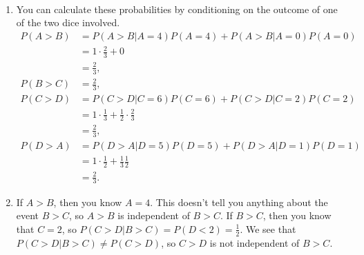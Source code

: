 

\setcounter{theorem}{31}
\begin{exercise}[BH.2.32] 
\begin{solution}~
	\begin{enumerate}
		\item You can calculate these probabilities by conditioning on the outcome of one of the two dice involved.
		\begin{align*}
			P(A>B)& = P(A>B|A=4)P(A=4) + P(A>B|A=0)P(A=0)\\
			&=1\cdot \frac{2}{3} + 0\\
			& = \frac{2}{3},\\
			P(B>C)& = \frac{2}{3},\\
			P(C>D)& = P(C>D|C=6)P(C=6) + P(C>D|C=2)P(C=2)\\
			&=1\cdot \frac{1}{3} + \frac{1}{2}\cdot\frac{2}{3}\\
			& = \frac{2}{3},\\
			P(D>A)&= P(D>A|D=5)P(D=5) + P(D>A|D=1)P(D=1) \\
			&= 1\cdot \frac{1}{2} + \frac{1}{3}\frac{1}{2}\\
			& = \frac{2}{3}.
		\end{align*}
		\item If $A>B$, then you know $A=4$. This doesn't tell you anything about the event $B>C$, so $A>B$ is independent of $B>C$. If $B>C$, then you know that $C=2$, so  $P(C>D|B>C)=P(D<2)=\frac{1}{2}$. We see that $P(C>D|B>C)\neq P(C>D)$, so $C>D$ is not independent of $B>C$.
	\end{enumerate}
\end{solution}
\end{exercise}

